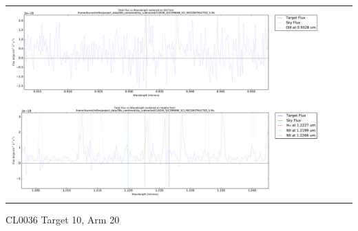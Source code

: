 \documentclass[10pt,letterpaper]{article}
\begin{document}
\begin{table}[h!]
\begin{center}
\begin{tabular}{ >{\centering\arraybackslash}m{2.5in} >{\centering\arraybackslash}m{2.5in} >{\centering\arraybackslash}m{2.5in} >{\centering\arraybackslash}m{2.3in}}
\includegraphics[scale=0.45]{../figures/CL0036_IZ/COMBINE_SCI_RECONSTRUCTED_5_OIII.pdf} \\
\includegraphics[scale=0.45]{../figures/CL0036_YJ/COMBINE_SCI_RECONSTRUCTED_5_Halpha.pdf}
\end{tabular}
\end{center}
\end{table}

\newpage

CL0036 Target 10, Arm 20 \\
\end{document}
